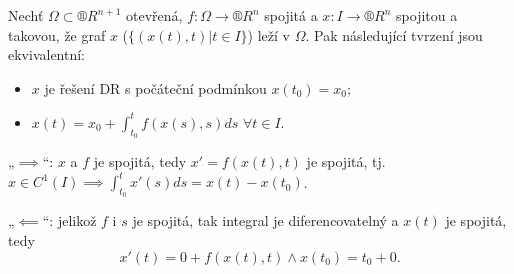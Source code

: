 \documentclass[12pt]{article}					%
\begin{document}
\begin{lemma}
	Nechť $\Omega \subset ®R^{n+1}$ otevřená, $f: \Omega \rightarrow ®R^n$ spojitá a $x: I \rightarrow ®R^n$ spojitou a takovou, že graf $x$ ($\{(x(t), t) | t \in I\}$) leží v $\Omega$. Pak následující tvrzení jsou ekvivalentní:

	\begin{itemize}
		\item $x$ je řešení DR s počáteční podmínkou $x(t_0) = x_0$;
		\item $x(t) = x_0 + \int_{t_0}^t f(x(s), s) ds$ $\forall t \in I$.
	\end{itemize}

	\begin{dukazin}
		„$\implies$“: $x$ a $f$ je spojitá, tedy $x' = f(x(t), t)$ je spojitá, tj. $x \in C^1(I) \implies \int_{t_0}^t x'(s) ds = x(t) - x(t_0)$.

		„$\impliedby$“: jelikož $f$ i $s$ je spojitá, tak integral je diferencovatelný a $x(t)$ je spojitá, tedy
		$$ x'(t) = 0 + f(x(t), t) \land x(t_0) = t_0 + 0. $$
	\end{dukazin}
\end{lemma}
\end{document}
